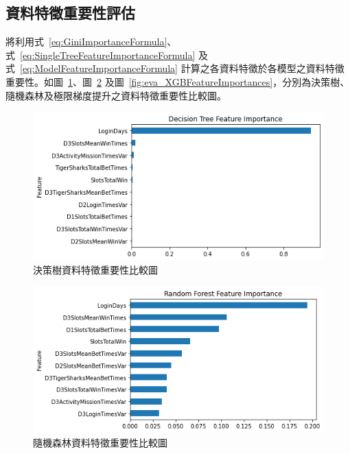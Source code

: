 \subsection{資料特徵重要性評估}
\label{subsec:FeatureImportanceEvaluation}

將利用式~\ref{eq:GiniImportanceFormula}、式~\ref{eq:SingleTreeFeatureImportanceFormula} 及式~\ref{eq:ModelFeatureImportanceFormula} 計算之各資料特徵於各模型之資料特徵重要性。如圖~\ref{fig:eva_DTFeatureImportances}、圖~\ref{fig:eva_RFFeatureImportances} 及圖~\ref{fig:eva_XGBFeatureImportances}，分別為決策樹、隨機森林及極限梯度提升之資料特徵重要性比較圖。

\begin{figure}[!htb]
    \begin{center}
      \includegraphics[width=1\textwidth]{figures/evaluation/Image_DTFeatureImportances.png}
      \caption[決策樹資料特徵重要性比較圖]{決策樹資料特徵重要性比較圖}
      \label{fig:eva_DTFeatureImportances}
    \end{center}
\end{figure}
\newpage

\begin{figure}[!htb]
    \begin{center}
      \includegraphics[width=1\textwidth]{figures/evaluation/Image_RFFeatureImportances.png}
      \caption[隨機森林資料特徵重要性比較圖]{隨機森林資料特徵重要性比較圖}
      \label{fig:eva_RFFeatureImportances}
    \end{center}
\end{figure}

